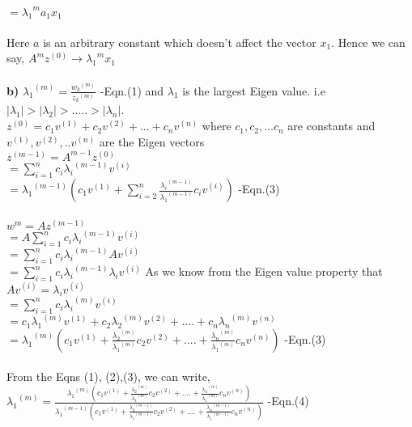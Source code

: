 \documentclass{article}
\begin{document}
$ =  {{{\lambda}_1}^m}{a_1}{x_1}$\\
\\
Here $a$ is an arbitrary constant which doesn't affect the vector $x_1$.
Hence we can say, ${A^m}{z^{(0)}} \rightarrow {{{\lambda}_1}^m}{x_1}$\\
\\
{\bf b)} ${{{\lambda}_1}^{(m)}} =  \frac{{w_k}^{(m)}}{{z_k}^{(m)}}$ -Eqn.(1) and ${{\lambda}_1}$ is the largest Eigen value.
i.e $\left|{{\lambda}_1} \right| > \left|{{\lambda}_2} \right| > ..... > \left|{{\lambda}_n} \right|$.\\
$z^{(0)} = {c_1}{v^{(1)}} + {c_2}{v^{(2)}} + ...+ {c_n}{v^{(n)}}$ where $c_1, c_2, ... c_n$ are constants and $v^{(1)}, v^{(2)}, .. v^{(n)}$ are the Eigen vectors\\
$z^{(m - 1)} = A^{m - 1}z^{(0)}$\\
$ = \sum_{i=1}^{n}{c_i}{{{\lambda}_i}^{(m-1)}}{v^{(i)}}$\\
$ = {{{\lambda}_1}^{(m-1)}}({c_1}{v^{(1)}} + \sum_{i=2}^{n}\frac{{{\lambda}_i}^{(m-1)}}{{{\lambda}_1}^{(m-1)}}{c_i}{v^{(i)}})$ -Eqn.(3)\\
\\
$w^m = Az^{(m - 1)}$\\
$ = A\sum_{i=1}^{n}{c_i}{{{\lambda}_i}^{(m-1)}}{v^{(i)}}$\\
$ = \sum_{i=1}^{n}{c_i}{{{\lambda}_i}^{(m-1)}}A{v^{(i)}}$\\
$ = \sum_{i=1}^{n}{c_i}{{{\lambda}_i}^{(m-1)}}{{\lambda}_i}{v^{(i)}}$  As we know from the Eigen value property that $A{v^{(i)}} = {{\lambda}_i}{v^{(i)}}$\\
$ = \sum_{i=1}^{n}{c_i}{{{\lambda}_i}^{(m)}}{v^{(i)}}$\\
$ = {c_1}{{{\lambda}_1}^{(m)}}{v^{(1)}} + {c_2}{{{\lambda}_2}^{(m)}}{v^{(2)}} + ....  + {c_n}{{{\lambda}_n}^{(m)}}{v^{(n)}}$\\
$ = {{{\lambda}_1}^{(m)}}({c_1}{v^{(1)}} + \frac{{{\lambda}_2}^{(m)}}{{{\lambda}_1}^{(m)}}{c_2}{v^{(2)}} + ....  +  \frac{{{\lambda}_n}^{(m)}}{{{\lambda}_1}^{(m)}}{c_n}{v^{(n)}})$ -Eqn.(3)\\
\\
From the Eqns (1), (2),(3), we can write,\\
${{{\lambda}_1}^{(m)}} = \frac{{{{\lambda}_1}^{(m)}}({c_1}{v^{(1)}} + \frac{{{\lambda}_2}^{(m)}}{{{\lambda}_1}^{(m)}}{c_2}{v^{(2)}} + ....  +  \frac{{{\lambda}_n}^{(m)}}{{{\lambda}_1}^{(m)}}{c_n}{v^{(n)}})}{{{{\lambda}_1}^{(m-1)}}({c_1}{v^{(1)}} + \frac{{{\lambda}_2}^{(m-1)}}{{{\lambda}_1}^{(m-1)}}{c_2}{v^{(2)}} + ....  +  \frac{{{\lambda}_n}^{(m-1)}}{{{\lambda}_1}^{(m-1)}}{c_n}{v^{(n)}})}$ -Eqn.(4)\\
\end{document}
